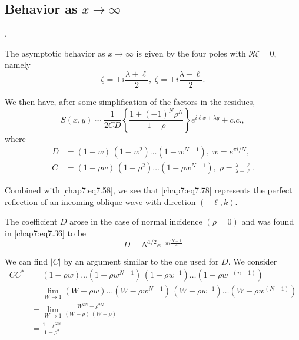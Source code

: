 {{\subsection*{\bf Behavior as $x\to\infty$}.

The asymptotic behavior as $x\to\infty$ is given by the four poles with $\mathscr{R}\zeta=0$, namely
\begin{equation}
\zeta=\pm i\frac{\lambda+\ell}{2},\;\zeta=\pm i \frac{\lambda-\ell}{2}. \tag{7.77}\label{chap7:eq7.77}
\end{equation}

We then have, after some simplification of the factors in the residues, 
\begin{equation}
S(x,y)\sim\frac{1}{2CD}\left\{\frac{1+(-1)^N\rho^N}{1-\rho}\right\} e^{i\ell x+\lambda y}+c.c.,\tag{7.78}\label{chap7:eq7.78}
\end{equation}
where
\begin{align}
D&=(1-w)\,(1-w^2)\ldots\left(1-w^{N-1}\right),\;w=e^{\pi i/N}, \tag{7.79}\label{chap7:eq7.79}\\
C&= (1-\rho w)\,(1-\rho^2)\ldots\left(1-\rho w^{N-1}\right),\;\rho= \frac{\lambda-\ell}{\lambda+\ell}.\tag{7.80}\label{chap7:eq7.80}
\end{align}

Combined with \eqref{chap7:eq7.58}, we see that \eqref{chap7:eq7.78} represents the perfect reflection of an incoming oblique wave with direction $(-\ell,k)$.

The coefficient $D$ arose in the case of normal incidence $(\rho=0)$ and was found in \eqref{chap7:eq7.36} to be 
\begin{equation}
D=N^{1/2}e^{-\pi i\frac{N-1}{4}}\tag{7.81}\label{chap7:eq7.81}
\end{equation}

We can find $|C|$ by an argument similar to the one used for $D$. We consider
\begin{align*}
CC^* &= (1-\rho w)\ldots\left(1-\rho w^{N-1}\right)\,\left(1-\rho w^{-1}\right) \ldots \left(1-\rho w^{-(n-1)}\right)\\
&= \underset{W\to 1}{\lim}(W-\rho w)\ldots \left(W-\rho w^{N-1}\right)\, \left(W-\rho w^{-1}\right)\ldots\left(W-\rho w^{(N-1)}\right)\\
&= \underset{W\to 1}{\lim }\frac{W^{2N}-\rho^{2N}}{(W-\rho)\,(W+\rho)}\\
&= \frac{1-\rho^{2N}}{1-\rho^2}\tag{7.82}\label{chap7:eq7.82}
\end{align*}\pageoriginale

}}
